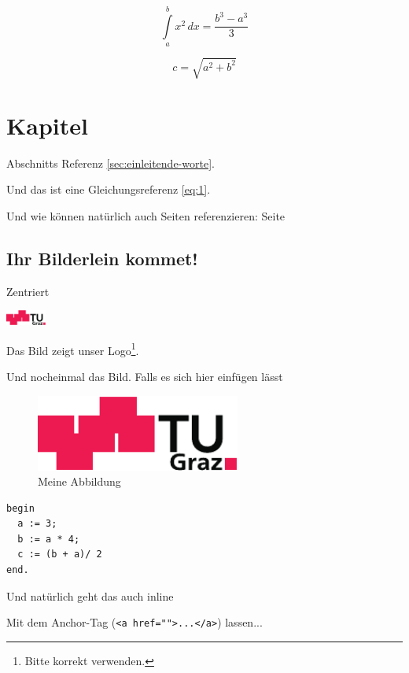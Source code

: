 \documentclass[12pt]{scrreprt}
\begin{document}
\begin{equation}
  \label{eq:2}
  \int\limits_{a}^{b} x^{2} \, dx = \frac{ b^{3} - a^{3} }{3}
\end{equation}

\begin{equation}
  \label{eq:3}
  c = \sqrt{ a^{2} + b^{2} }
\end{equation}

\chapter{Kapitel}

Abschnitts Referenz \ref{sec:einleitende-worte}.

Und das ist eine Gleichungsreferenz \eqref{eq:1}.

Und wie können natürlich auch Seiten referenzieren: Seite \pageref{sec:einleitende-worte}

\section{Ihr Bilderlein kommet!}

\begin{center}
  Zentriert
  
  \includegraphics[width=0.1\textwidth]{tug-logo}
  
  Das Bild zeigt unser Logo\footnote{Bitte korrekt verwenden.}.
\end{center}

Und nocheinmal das Bild. Falls es sich hier einfügen lässt

\begin{figure}
  \centering
   \includegraphics[width=0.6\textwidth]{tug-logo}
   \caption{Meine Abbildung}
   \label{fig:mein-bild}
\end{figure}

\lstset{language=Pascal}
\begin{lstlisting}[caption=Pascal Code, label=lst:mycode]
begin
  a := 3;
  b := a * 4;
  c := (b + a)/ 2
end.
\end{lstlisting}

Und natürlich geht das auch inline

Mit dem Anchor-Tag (\lstinline!<a href="">...</a>!) lassen...
\end{document}
